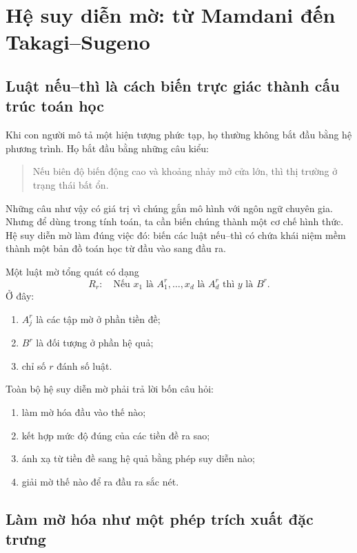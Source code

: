 \chapter{Hệ suy diễn mờ: từ Mamdani đến Takagi--Sugeno}

\section{Luật nếu--thì là cách biến trực giác thành cấu trúc toán học}

Khi con người mô tả một hiện tượng phức tạp, họ thường không bắt đầu bằng hệ phương trình. Họ bắt đầu bằng những câu kiểu:

\begin{quote}
Nếu biên độ biến động cao và khoảng nhảy mở cửa lớn, thì thị trường ở trạng thái bất ổn.
\end{quote}

Những câu như vậy có giá trị vì chúng gắn mô hình với ngôn ngữ chuyên gia. Nhưng để dùng trong tính toán, ta cần biến chúng thành một cơ chế hình thức. Hệ suy diễn mờ làm đúng việc đó: biến các luật nếu--thì có chứa khái niệm mềm thành một bản đồ toán học từ đầu vào sang đầu ra.

Một luật mờ tổng quát có dạng
\[
R_r:\quad
\text{Nếu } x_1 \text{ là } A_1^r,\dots,x_d \text{ là } A_d^r
\text{ thì } y \text{ là } B^r.
\]
Ở đây:

\begin{enumerate}
\item \(A_j^r\) là các tập mờ ở phần tiền đề;
\item \(B^r\) là đối tượng ở phần hệ quả;
\item chỉ số \(r\) đánh số luật.
\end{enumerate}

Toàn bộ hệ suy diễn mờ phải trả lời bốn câu hỏi:

\begin{enumerate}
\item làm mờ hóa đầu vào thế nào;
\item kết hợp mức độ đúng của các tiền đề ra sao;
\item ánh xạ từ tiền đề sang hệ quả bằng phép suy diễn nào;
\item giải mờ thế nào để ra đầu ra sắc nét.
\end{enumerate}

\section{Làm mờ hóa như một phép trích xuất đặc trưng}

